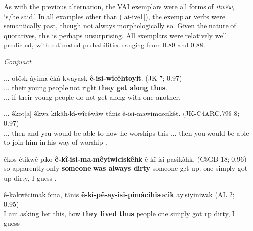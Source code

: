     
As with the previous alternation, the VAI exemplars were all forms of \textit{itwêw}, `s/he said.' In all examples other than (\ref{ai-ive1}), the exemplar verbs were semantically past, though not always morphologically so. Given the nature of quotatives, this is perhaps unsurprising. All exemplars were relatively well predicted, with estimated probabilities ranging from 0.89 and 0.88.

\textit{Conjunct}
    \begin{exe}
    \ex
    \gll ... otôsk-âyima êkâ kwayask \textbf{ê-isi-wîcêhtoyit}. \tiny{(JK 7; 0.97)} \\
         ... {their young people} not right {\textbf{they get along thus}}. \\
    \trans  ... if their young people do not get along with one another. \tiny{\citep[48-49]{KaNipitehtew1998}}
    \label{ti-ive6}
    \end{exe}
    
        \begin{exe}
    \ex
    \gll ... êkot[a] êkwa kikâh-kî-wîcêwâw tânis ê-isi-mawimoscikêt. \tiny{(JK-C4ARC.798 8; 0.97)} \\
    ... then and {you would be able to} how {he worships this}
    \trans  ... then you would be able to join him in his way of worship \tiny{\citep[50]{KaNipitehtew1998}}. \\
    \label{ti-ive7}
    \end{exe}
    
    
    \begin{exe}
    \ex
    \gll êkos êtikwê piko \textbf{ê-kî-isi-ma-mêyiwiciskêhk} ê-kî-isi-pasikôhk. \tiny{(C8GB 18; 0.96)} \\
         so apparently only {\textbf{someone was always dirty}} {someone get up}.
    \trans  one simply got up dirty, I guess \tiny{\citep[210-211]{Bearetal1992}}. \\
    \label{ti-ive8}
    \end{exe}
    
    \begin{exe}
    \ex
    \gll ê-kakwêcimak ôma, tânis \textbf{ê-kî-pê-ay-isi-pimâcihisocik} ayisiyiniwak (AL 2; 0.95) \\
         {I am asking her} this, how {\textbf{they lived thus}} people
    \trans  one simply got up dirty, I guess \tiny{\citep[240-241]{Bearetal1992}}. \\
    \label{ti-ive9}
    \end{exe}
    
